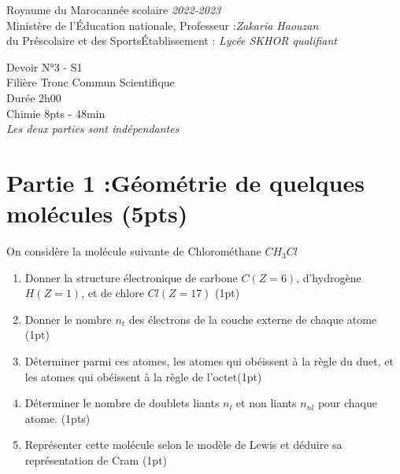 \documentclass[12pt]{article}
\newcommand\headerMe[2]{\noindent{}#1\hfill#2}
\begin{document}
\headerMe{Royaume du Maroc}{année scolaire \emph{2022-2023}}\\
\headerMe{Ministère de l'Éducation nationale, }{  Professeur :\emph{Zakaria Haouzan}}\\
\headerMe{du Préscolaire et des Sports}{Établissement : \emph{Lycée SKHOR qualifiant}}\\

\begin{center}

    \vspace{-1.5cm}
Devoir  N°3 - S1 \\
   Filière Tronc Commun Scientifique\\
Durée 2h00
\\
\hrulefill
\Large{Chimie 8pts - 48min}
\hrulefill\\

    \emph{Les deux parties sont indépendantes}
\end{center}
 
    \vspace{-1.2cm}
    
\section*{Partie 1 :Géométrie de quelques molécules  \dotfill (5pts)}

On considère la molécule suivante de Chlorométhane $CH_3Cl$

\begin{enumerate}

\item Donner la structure électronique de carbone $C (Z=6)$, d’hydrogène $H (Z=1)$, et de chlore $Cl (Z=17)$ \dotfill(1pt)
\item  Donner le nombre $n_t$ des électrons de la couche externe de chaque atome \dotfill(1pt)
\item  Déterminer parmi ces atomes, les atomes qui obéissent à la règle du duet, et les atomes qui obéissent
à la règle de l’octet\dotfill(1pt)

\item   Déterminer le nombre de doublets liants $n_l$ et non liants $n_{nl}$ pour chaque atome. \dotfill(1pts)

\item  Représenter cette molécule selon le modèle de Lewis et déduire sa représentation de Cram \dotfill(1pt)

\end{enumerate}
\end{document}
